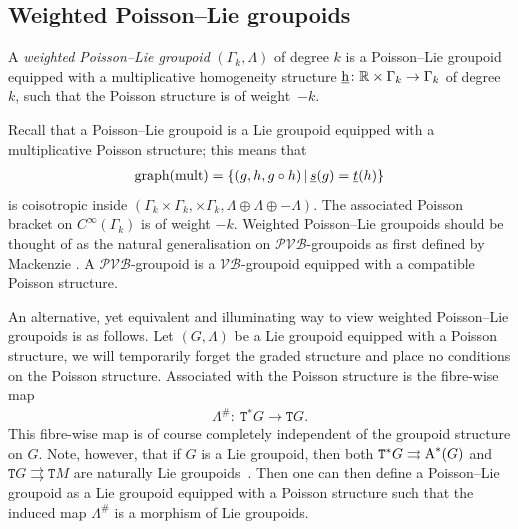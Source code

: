 \documentclass[pdftex]{sigma}
\newcommand{\rmh}{\textnormal{h}}
\def\sT{{\mathtt T}}
\numberwithin{equation}{section}
\begin{document}
\subsection{Weighted Poisson--Lie groupoids}

\begin{Definition}
A \emph{weighted Poisson--Lie groupoid} $(\Gamma_{k}, \Lambda)$ of degree $k$ is a Poisson--Lie groupoid equipped with a multiplicative homogeneity structure $\underline{\rmh}\colon  \mathbb{R}\times \Gamma_{k} \rightarrow \Gamma_{k}$ of degree~$k$, such that the Poisson structure is of weight~${-}k$.
\end{Definition}



Recall that a Poisson--Lie groupoid is a Lie groupoid equipped with a multiplicative Poisson structure; this means that
\begin{gather*}
\textnormal{graph}(\textnormal{mult}) = \{(g,h,  g\circ h) \,| \, \underline{s}(g) = \underline{t}(h)  \}
\end{gather*}
 is coisotropic inside $ ( \Gamma_{k} \times \Gamma_{k}, \times \Gamma_{k}, \Lambda\oplus \Lambda \oplus {-}\Lambda )$.  The associated Poisson bracket on $C^{\infty}(\Gamma_{k})$ is of weight ${-}k$.
Weighted Poisson--Lie groupoids should be thought of as the natural generalisation on $\mathcal{PVB}$-groupoids as f\/irst def\/ined by Mackenzie \cite{Mackenzie:1999}. A  $\mathcal{PVB}$-groupoid is a $\mathcal{VB}$-groupoid equipped with a compatible Poisson structure.

An alternative, yet equivalent and illuminating way to view weighted Poisson--Lie groupoids is as follows. Let $(G, \Lambda)$ be a Lie groupoid equipped with a Poisson structure, we will temporarily forget the graded structure and place no conditions on the Poisson structure.  Associated with the Poisson structure is the f\/ibre-wise map
\begin{gather*}
\Lambda^{\#}\colon \  \sT^{*}G \rightarrow \sT G.
\end{gather*}
 This f\/ibre-wise map is of course completely independent of the groupoid structure on $G$.
Note, however, that if  $G$ is a Lie groupoid, then both $\sT^{*}G \rightrightarrows \textnormal{A}^{*}(G)$ and $\sT G \rightrightarrows \sT M$ are naturally Lie groupoids~\cite{Mackenzie2005}.  Then one can then def\/ine a Poisson--Lie groupoid as a Lie groupoid equipped with a Poisson structure such that the induced map $\Lambda^{\#}$ is a morphism of Lie groupoids.
\end{document}
